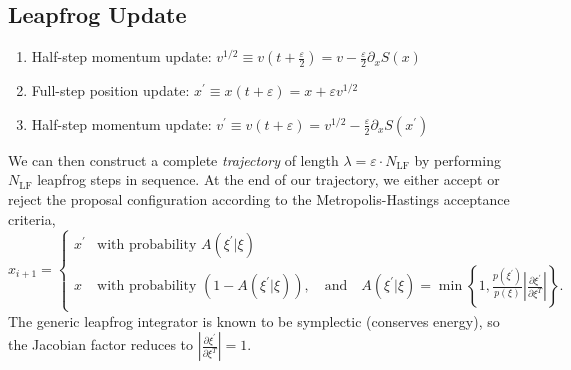 \documentclass{article} %
\begin{document}
\subsection{\label{subsec:leapfroghmc}Leapfrog Update}
%
\begin{enumerate}
   \item Half-step momentum update: \hspace{12pt}\(%
      v^{1/2} \equiv v{\left(t+\frac{\varepsilon}{2}\right)} = v-\frac{\varepsilon}{2}\partial_{x}S(x)
   \)
   \item Full-step position update: \hspace{36pt}\(%
      x^{\prime} \equiv x(t+\varepsilon) = x + \varepsilon v^{1/2}
   \)
   \item Half-step momentum update:
      \hspace{18pt} \(%
         v^{\prime} \equiv v(t+\varepsilon) = v^{1/2} - \frac{\varepsilon}{2}\partial_{x} S(x^{\prime})
   \)
\end{enumerate}
%
We can then construct a complete \emph{trajectory} of length \(\lambda = \varepsilon\cdot N_{\mathrm{LF}}\) by
performing \(N_{\mathrm{LF}}\) leapfrog steps in sequence.
%
At the end of our trajectory, we either accept or reject the proposal configuration according to the Metropolis-Hastings
acceptance criteria,
%
\begin{equation}
   x_{i+1} =
   \begin{cases}%
      x^{\prime} &\mbox{with probability } A(\xi^{\prime}|\xi) \\
      x &\mbox{with probability } (1 - A(\xi^{\prime}|\xi)), \quad\text{and}\quad%
         A(\xi^{\prime}|\xi) = \min\left\{%
            1, \frac{p(\xi^{\prime})}{p(\xi)}\left|\frac{\partial{\xi^{\prime}}}{\partial\xi^{T}}\right|%
         \right\}.
   \end{cases}
   \label{eq:mhcriteria}
\end{equation}
%
The generic leapfrog integrator is known to be symplectic (conserves energy), so the Jacobian factor reduces to
\(\left|\frac{\partial\xi^{\prime}}{\partial\xi^{T}}\right| = 1\). 
%
\end{document}
